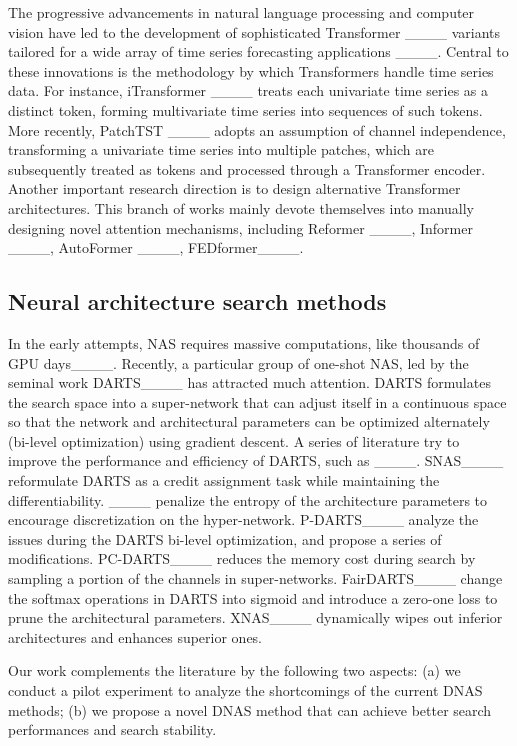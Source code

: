 The progressive advancements in natural language processing and computer vision have led to the development of sophisticated Transformer ____ variants tailored for a wide array of time series forecasting applications ____. Central to these innovations is the methodology by which Transformers handle time series data. For instance, iTransformer ____ treats each univariate time series as a distinct token, forming multivariate time series into sequences of such tokens. More recently, PatchTST ____ adopts an assumption of channel independence, transforming a univariate time series into multiple patches, which are subsequently treated as tokens and processed through a Transformer encoder. Another important research direction is to design alternative Transformer architectures. This branch of works mainly devote themselves into manually designing novel attention mechanisms, including  Reformer ____, Informer ____, AutoFormer ____, FEDformer____. 


\subsection{Neural architecture search methods}

In the early attempts, NAS requires massive computations, like thousands of GPU days____. Recently, a particular group of one-shot NAS, led by the seminal work DARTS____ has attracted much attention. DARTS formulates the search space into a super-network that can adjust itself in a continuous space so that the network and architectural parameters can be optimized alternately (bi-level optimization) using gradient descent. A series of literature try to improve the performance and efficiency of DARTS, such as ____. SNAS____ reformulate DARTS as a credit assignment task while maintaining the differentiability. ____ penalize the entropy of the architecture parameters to encourage discretization on the hyper-network. P-DARTS____ analyze the issues during the DARTS bi-level optimization, and propose a series of modifications. PC-DARTS____ reduces the memory cost during search by sampling a portion of the channels in super-networks. FairDARTS____ change the softmax operations in DARTS into sigmoid and introduce a zero-one loss to prune the architectural parameters. XNAS____ dynamically wipes out inferior architectures and enhances superior ones.

Our work complements the literature by the following two aspects: (a) we conduct a pilot experiment to analyze the shortcomings of the current DNAS methods; (b) we propose a novel DNAS method that can achieve better search performances and search stability.